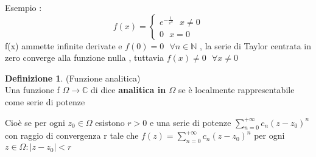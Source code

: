 \documentclass{article}
\theoremstyle{definition}
\newtheorem*{definizione}{Definizione}
\newcommand{\C}{\mathbb{C}}
\newcommand{\norm}[1]{|#1|}
\begin{document}
	Esempio : $$f(x)= \begin{cases}
		e^{-\frac{1}{x^2}} \ \ \ x \neq 0\\
		0 \ \ \ x=0 
	\end{cases} $$ f(x) ammette infinite derivate e $f(0)=0\ \ \ \forall n \in \mathbb{N}$ , la serie di Taylor centrata in zero converge alla funzione nulla , tuttavia $f(x)\neq 0 \ \ \ \forall x \neq 0$   
	\begin{definizione}(Funzione analitica)\\
		Una funzione f $\Omega \rightarrow \C$ di dice \textbf{analitica in $\Omega$} se è localmente rappresentabile come serie di potenze
	\end{definizione}
	Cioè se per ogni $z_0 \in \Omega$ esistono $r>0$ e una serie di potenze $\sum_{n=0}^{+\infty}c_n(z-z_0)^n$ con raggio di convergenza r tale che $f(z)= \sum_{n=0}^{+\infty}c_n(z-z_0)^n$ per ogni $z \in \Omega : \norm{z-z_0}<r$
\end{document}
